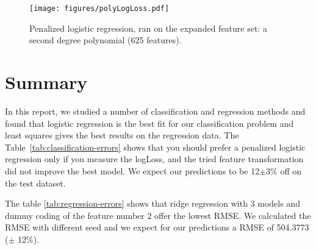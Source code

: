 \documentclass{article} %
\begin{document}
\begin{figure}[h]
\center
\texttt{[image: figures/polyLogLoss.pdf]}
\caption{Penalized logistic regression, ran on the expanded feature set: a second degree polynomial (625 features).}
\label{fig:polyErrors}
\end{figure}

\section{Summary}

In this report, we studied a number of classification and regression methods and found that logistic regression is the best fit for our classification problem and least squares gives the best results on the regression data. The Table~\ref{tab:classification-errors} shows that you should prefer a penalized logistic regression only if you measure the logLoss, and the tried feature transformation did not improve the best model. We expect our predictions to be 12$\pm$3\% off on the test dataset.

The table \ref{tab:regression-errors} shows that ridge regression with 3 models and dummy coding of the feature number 2 offer the lowest RMSE.
We calculated the RMSE with different seed and we expect for our predictions a RMSE of 504.3773 ($\pm$ 12\%).
\end{document}

